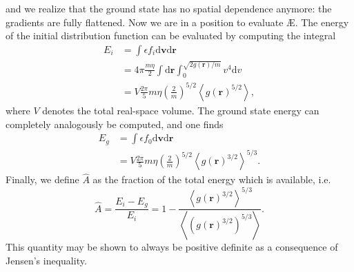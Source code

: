 and we realize that the ground state has no spatial dependence anymore: the gradients are fully flattened. Now we are in a position to evaluate \AE{}. The energy of the initial distribution function can be evaluated by computing the integral
\begin{equation}
\begin{aligned}
    E_i &= \int \epsilon f_i \mathrm{d} \boldsymbol{v}\mathrm{d} \boldsymbol{r} \\
    &= 4 \pi \frac{m\eta}{2} \int \mathrm{d} \boldsymbol{r}\int_0^{\sqrt{2g(\boldsymbol{r})/m}} v^4 \mathrm{d}v \\
    &= V \frac{2 \pi}{5} m\eta \left( \frac{2}{m} \right)^{5/2} \left \langle g(\boldsymbol{r})^{5/2} \right \rangle,
\end{aligned}
\end{equation}
where $V$ denotes the total real-space volume. The ground state energy can completely analogously be computed, and one finds
\begin{equation}
\begin{aligned}
    E_g &= \int \epsilon f_0 \mathrm{d} \boldsymbol{v}\mathrm{d} \boldsymbol{r} \\
    &= V \frac{2 \pi}{5} m\eta \left( \frac{2}{m} \right)^{5/2} \left \langle g(\boldsymbol{r})^{3/2} \right \rangle^{5/3}.
\end{aligned}
\end{equation}
Finally, we define $\widehat{A}$ as the fraction of the total energy which is available, i.e.
\begin{equation}
    \widehat{A} = \frac{E_i - E_g}{E_i} = 1 - \frac{\left\langle g(\boldsymbol{r})^{3/2} \right\rangle^{5/3}}{\left\langle (g(\boldsymbol{r})^{3/2})^{5/3} \right\rangle}.
    \label{eq: ae-unconstrained}
\end{equation}
This quantity may be shown to always be positive definite as a consequence of Jensen's inequality. 
